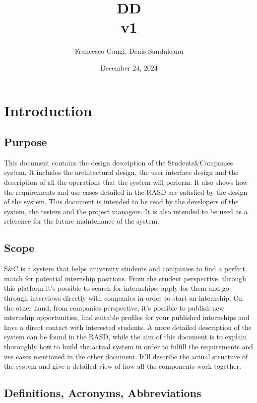 \documentclass{article}
\title{DD \\ [0.5ex] \small v1}
\author{Francesco Gangi, Denis Sanduleanu}
\date{December 24, 2024}
\begin{document}
\maketitle

\newpage

\tableofcontents

\newpage

\section{Introduction}

\subsection{Purpose}

This document contains the design description of the Students\&Companies system. It includes the architectural design, the user interface design and the description of all the operations that the system will perform. It also shows how the requirements and use cases detailed in the RASD are satisfied by the design of the system.
This document is intended to be read by the developers of the system, the testers and the project managers. It is also intended to be used as a reference for the future maintenance of the system.

\subsection{Scope}

S\&C is a system that helps university students and companies to find a perfect match for potential internship positions. From the student perspective, through this platform it's possible to search for internships, apply for them and go through interviews directly with companies in order to start an internship. On the other hand, from companies perspective, it's possible to publish new internship opportunities, find suitable profiles for your published internships and have a direct contact with interested students. A more detailed description of the system can be found in the RASD, while the aim of this document is to explain thoroughly how to build the actual system in order to fulfill the requirements and use cases mentioned in the other document. It'll describe the actual structure of the system and give a detailed view of how all the components work together.

\subsection{Definitions, Acronyms, Abbreviations}
\end{document}
